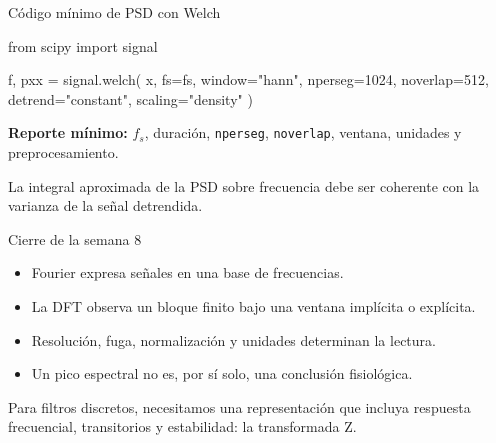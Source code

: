\documentclass[
  ignorenonframetext,
  aspectratio=169,
  spanish,
  professionalfonts]{beamer}
\newenvironment{Shaded}{\begin{snugshade}}{\end{snugshade}}
\newcommand{\DecValTok}[1]{\textcolor[rgb]{0.68,0.00,0.00}{#1}}
\newcommand{\ImportTok}[1]{\textcolor[rgb]{0.00,0.46,0.62}{#1}}
\newcommand{\NormalTok}[1]{\textcolor[rgb]{0.00,0.23,0.31}{#1}}
\newcommand{\OperatorTok}[1]{\textcolor[rgb]{0.37,0.37,0.37}{#1}}
\newcommand{\StringTok}[1]{\textcolor[rgb]{0.13,0.47,0.30}{#1}}
\providecommand{\tightlist}{%
  \setlength{\itemsep}{0pt}\setlength{\parskip}{0pt}}
\begin{document}
\begin{frame}[fragile]{Código mínimo de PSD con Welch}
\protect{}\label{cuxf3digo-muxednimo-de-psd-con-welch}
\begin{Shaded}
\begin{Highlighting}[]
\ImportTok{from}\NormalTok{ scipy }\ImportTok{import}\NormalTok{ signal}

\NormalTok{f, pxx }\OperatorTok{=}\NormalTok{ signal.welch(}
\NormalTok{    x, fs}\OperatorTok{=}\NormalTok{fs, window}\OperatorTok{=}\StringTok{"hann"}\NormalTok{,}
\NormalTok{    nperseg}\OperatorTok{=}\DecValTok{1024}\NormalTok{, noverlap}\OperatorTok{=}\DecValTok{512}\NormalTok{,}
\NormalTok{    detrend}\OperatorTok{=}\StringTok{"constant"}\NormalTok{, scaling}\OperatorTok{=}\StringTok{"density"}
\NormalTok{)}
\end{Highlighting}
\end{Shaded}

\textbf{Reporte mínimo:} \(f_s\), duración, \texttt{nperseg},
\texttt{noverlap}, ventana, unidades y preprocesamiento.

\begin{tcolorbox}[enhanced jigsaw, arc=.35mm, bottomrule=.15mm, bottomtitle=1mm, breakable, colback=white, colbacktitle=quarto-callout-tip-color!10!white, colframe=quarto-callout-tip-color-frame, coltitle=black, left=2mm, leftrule=.75mm, opacityback=0, opacitybacktitle=0.6, rightrule=.15mm, title={Comprobación}, titlerule=0mm, toprule=.15mm, toptitle=1mm]

La integral aproximada de la PSD sobre frecuencia debe ser coherente con
la varianza de la señal detrendida.

\end{tcolorbox}
\end{frame}

\begin{frame}{Cierre de la semana 8}
\protect{}\label{cierre-de-la-semana-8}
\begin{itemize}
\tightlist
\item
  Fourier expresa señales en una base de frecuencias.
\item
  La DFT observa un bloque finito bajo una ventana implícita o
  explícita.
\item
  Resolución, fuga, normalización y unidades determinan la lectura.
\item
  Un pico espectral no es, por sí solo, una conclusión fisiológica.
\end{itemize}

\begin{tcolorbox}[enhanced jigsaw, arc=.35mm, bottomrule=.15mm, bottomtitle=1mm, breakable, colback=white, colbacktitle=quarto-callout-important-color!10!white, colframe=quarto-callout-important-color-frame, coltitle=black, left=2mm, leftrule=.75mm, opacityback=0, opacitybacktitle=0.6, rightrule=.15mm, title={Puente a la semana 9}, titlerule=0mm, toprule=.15mm, toptitle=1mm]

Para filtros discretos, necesitamos una representación que incluya
respuesta frecuencial, transitorios y estabilidad: la transformada Z.

\end{tcolorbox}
\end{frame}
\end{document}
